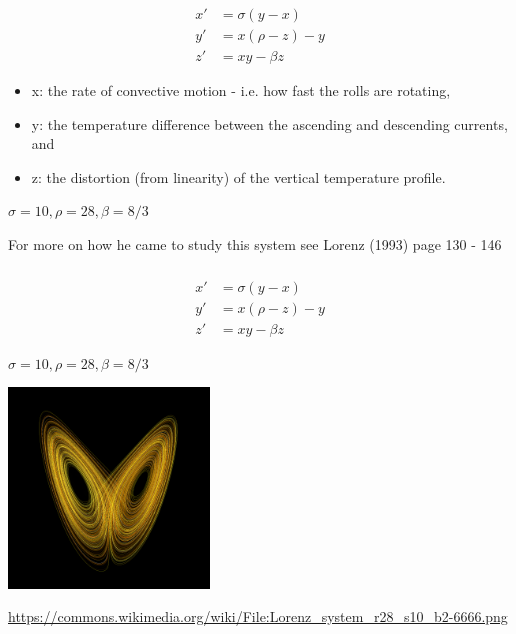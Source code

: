 \documentclass[aspectratio=169]{beamer}
\begin{document}
\begin{frame}
\frametitle{}

\begin{align*}
  x' &= \sigma(y-x) \\
  y' &= x(\rho-z)-y \\
  z' &= xy-\beta z
\end{align*}

\begin{itemize}
\item x: the rate of convective motion - i.e. how fast the rolls are rotating,
\item y: the temperature difference between the ascending and descending currents, and
\item z: the distortion (from linearity) of the vertical temperature profile.
\end{itemize}

\vfill
$\sigma = 10, \rho = 28,  \beta = 8/3$ 

\vfill
For more on how he came to study this system see Lorenz (1993) page 130 - 146

\end{frame}
\begin{frame}
\frametitle{}

\begin{align*}
  x' &= \sigma(y-x) \\
  y' &= x(\rho-z)-y \\
  z' &= xy-\beta z
\end{align*}

$\sigma = 10, \rho = 28,  \beta = 8/3$ 

\begin{center}
\includegraphics[width = 0.4\textwidth]{figures/Lorenz_system_r28_s10_b2-6666}
\end{center}

\vfill
\tiny{\url{https://commons.wikimedia.org/wiki/File:Lorenz_system_r28_s10_b2-6666.png}}
\end{frame}
\frame{\titlepage}
\end{document}
